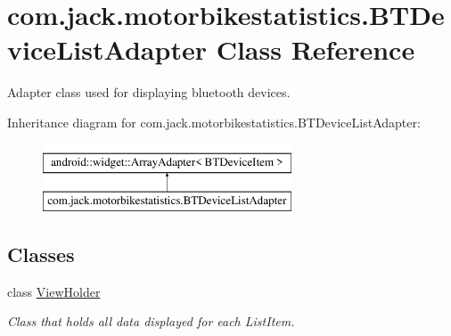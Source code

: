 \hypertarget{classcom_1_1jack_1_1motorbikestatistics_1_1_b_t_device_list_adapter}{}\section{com.\+jack.\+motorbikestatistics.\+B\+T\+Device\+List\+Adapter Class Reference}
\label{classcom_1_1jack_1_1motorbikestatistics_1_1_b_t_device_list_adapter}


Adapter class used for displaying bluetooth devices.  


Inheritance diagram for com.\+jack.\+motorbikestatistics.\+B\+T\+Device\+List\+Adapter\+:\begin{figure}[H]
\begin{center}
\leavevmode
\includegraphics[height=2.000000cm]{classcom_1_1jack_1_1motorbikestatistics_1_1_b_t_device_list_adapter}
\end{center}
\end{figure}
\subsection*{Classes}
\begin{DoxyCompactItemize}
\item 
class \hyperlink{classcom_1_1jack_1_1motorbikestatistics_1_1_b_t_device_list_adapter_1_1_view_holder}{View\+Holder}
\begin{DoxyCompactList}\small\item\em Class that holds all data displayed for each List\+Item. \end{DoxyCompactList}\end{DoxyCompactItemize}
